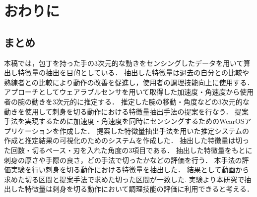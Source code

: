 \chapter{おわりに}
\section{まとめ}
本稿では，包丁を持った手の3次元的な動きをセンシングしたデータを用いて算出し特徴量の抽出を目的としている．
抽出した特徴量は過去の自分との比較や熟練者との比較により動作の改善を促進し，使用者の調理技能向上に使用する．
アプローチとしてウェアラブルセンサを用いて取得した加速度・角速度から使用者の腕の動きを3次元的に推定する．
推定した腕の移動・角度などの3次元的な動きを使用して刺身を切る動作における特徴量抽出手法の提案を行なう．
提案手法を実現するために加速度・角速度を同時にセンシングするためのWearOSアプリケーションを作成した．
提案した特徴量抽出手法を用いた推定システムの作成と推定結果の可視化のためのシステムを作成した．
抽出した特徴量は切った回数・切るペース・刃を入れた角度の3項目である．
抽出した特徴量をもとに刺身の厚さや手際の良さ，どの手法で切ったかなどの評価を行う．
本手法の評価実験を行い刺身を切る動作における特徴量を抽出した．
結果として動画から求めた切る区間と提案手法で求めた切った区間が一致した.
実験より本研究で抽出した特徴量は刺身を切る動作において調理技能の評価に利用できると考える．







